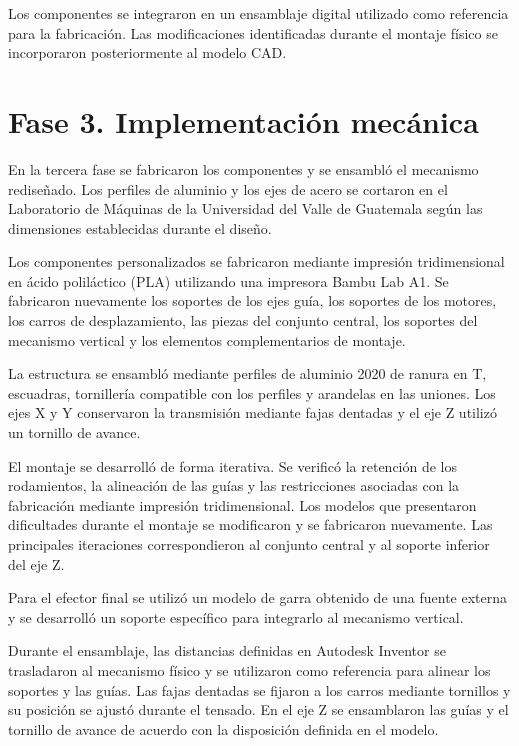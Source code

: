 Los componentes se integraron en un ensamblaje digital utilizado como referencia para la fabricación. Las modificaciones identificadas durante el montaje físico se incorporaron posteriormente al modelo CAD.



\section{Fase 3. Implementación mecánica}

En la tercera fase se fabricaron los componentes y se ensambló el mecanismo rediseñado. Los perfiles de aluminio y los ejes de acero se cortaron en el Laboratorio de Máquinas de la Universidad del Valle de Guatemala según las dimensiones establecidas durante el diseño.

Los componentes personalizados se fabricaron mediante impresión tridimensional en ácido poliláctico (PLA) utilizando una impresora Bambu Lab A1. Se fabricaron nuevamente los soportes de los ejes guía, los soportes de los motores, los carros de desplazamiento, las piezas del conjunto central, los soportes del mecanismo vertical y los elementos complementarios de montaje.

La estructura se ensambló mediante perfiles de aluminio 2020 de ranura en T, escuadras, tornillería compatible con los perfiles y arandelas en las uniones. Los ejes X y Y conservaron la transmisión mediante fajas dentadas y el eje Z utilizó un tornillo de avance.

El montaje se desarrolló de forma iterativa. Se verificó la retención de los rodamientos, la alineación de las guías y las restricciones asociadas con la fabricación mediante impresión tridimensional. Los modelos que presentaron dificultades durante el montaje se modificaron y se fabricaron nuevamente. Las principales iteraciones correspondieron al conjunto central y al soporte inferior del eje Z.

Para el efector final se utilizó un modelo de garra obtenido de una fuente externa y se desarrolló un soporte específico para integrarlo al mecanismo vertical.


Durante el ensamblaje, las distancias definidas en Autodesk Inventor se trasladaron al mecanismo físico y se utilizaron como referencia para alinear los soportes y las guías. Las fajas dentadas se fijaron a los carros mediante tornillos y su posición se ajustó durante el tensado. En el eje Z se ensamblaron las guías y el tornillo de avance de acuerdo con la disposición definida en el modelo.

